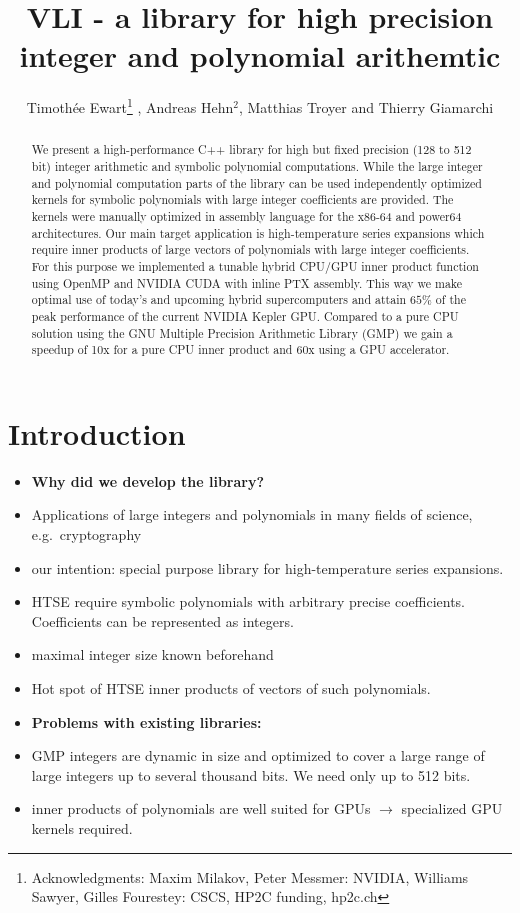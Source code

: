 \documentclass[oribibl]{llncs2e/llncs}
\title{VLI - a library for high precision integer and polynomial arithemtic}
\author{Timoth\'ee Ewart\inst{1}\thanks{Acknowledgments: Maxim Milakov, Peter Messmer:   NVIDIA,   Williams Sawyer, Gilles Fourestey:  CSCS, HP2C funding, hp2c.ch}  , Andreas Hehn$^2$, Matthias Troyer\inst{2} and Thierry Giamarchi\inst{1}}
\institute{Universit\'e de Gen\`eve, \email{timothee.ewart@gmail.com}  \and Eidgen\"ossische Technische Hochschule Z\"urich }
\begin{document}
\maketitle


\begin{abstract}
We present a high-performance C++ library for high but fixed precision
(128 to 512 bit) integer arithmetic and symbolic polynomial
computations. While the large integer and polynomial computation parts
of the library can be used independently optimized kernels for symbolic
polynomials with large integer coefficients are provided. The kernels
were manually optimized in assembly language for the x86-64 and power64
architectures. Our main target application is high-temperature series
expansions which require inner products of large vectors of polynomials
with large integer coefficients. For this purpose we implemented a
tunable hybrid CPU/GPU inner product function using OpenMP and NVIDIA
CUDA with inline PTX assembly. This way we make optimal use of today's
and upcoming hybrid supercomputers and attain $65\%$ of the peak
performance of the current NVIDIA Kepler GPU. Compared to a pure CPU
solution using the GNU Multiple Precision Arithmetic Library (GMP) we
gain a speedup of 10x for a pure CPU inner product and 60x using a GPU
accelerator.
\end{abstract}

\section{Introduction}
\begin{itemize}
\item {\bf Why did we develop the library?}
\item Applications of large integers and polynomials in many fields of science, e.g.\ cryptography
\item our intention: special purpose library for high-temperature series expansions.
\item HTSE require symbolic polynomials with arbitrary precise coefficients. Coefficients can be represented as integers.
\item maximal integer size known beforehand
\item Hot spot of HTSE inner products of vectors of such polynomials.
\item {\bf Problems with existing libraries:}
\item GMP integers \cite{GMP} are dynamic in size and optimized to cover a large range of large integers up to several thousand bits. We need only up to 512 bits.
\item inner products of polynomials are well suited for GPUs $\rightarrow$ specialized GPU kernels required.
\end{itemize}
\end{document}
